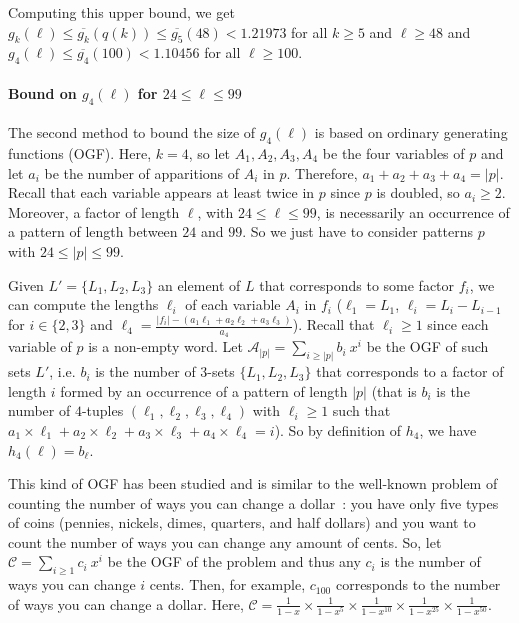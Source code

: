 \documentclass[]{elsart}
\newcommand{\set}[1]{\{#1\}}
\newcounter{example}
\begin{document}
Computing this upper bound, we get $g_k(\ell)\le
\overline{g_k}(q(k))\le \overline{g_5}(48) < 1.21973$ for all $k\ge 5$
and $\ell\ge 48$ and $g_4(\ell)\le \overline{g_4}(100) < 1.10456$ for
all $\ell\ge 100$.

\paragraph{Bound on $g_4(\ell)$ for $24\le \ell\le 99$} \label{par:l2}

The second method to bound the size of $g_4(\ell)$ is based on ordinary
generating functions (OGF). Here, $k=4$, so let $A_1,A_2,A_3,A_4$ be
the four variables of $p$ and let $a_i$ be the number of apparitions
of $A_i$ in $p$. Therefore, $a_1+a_2+a_3+a_4=|p|$. Recall that each
variable appears at least twice in $p$ since $p$ is doubled, so
$a_i\ge 2$. Moreover, a factor of length $\ell$, with $24\le\ell\le 99$, is
necessarily an occurrence of a pattern of length between $24$ and
$99$. So we just have to consider patterns $p$ with $24\le|p|\le 99$.

Given $L'=\set{L_1,L_2,L_3}$ an element of $L$ that corresponds to
some factor $f_i$, we can compute the lengths $\ell_i$ of each
variable $A_i$ in $f_i$ ($\ell_1 = L_1$, $\ell_i = L_i-L_{i-1}$ for
$i\in\set{2,3}$ and $\ell_4 =
\frac{|f_i|-(a_1\ell_1+a_2\ell_2+a_3\ell_3)}{a_4}$). Recall that
$\ell_i\ge 1$ since each variable of $p$ is a non-empty word. Let
$\mathcal{A}_{|p|}=\sum_{i\ge |p|}b_i\ x^i$ be the OGF of such sets
$L'$, i.e. $b_i$ is the number of $3$-sets $\set{L_1,L_2,L_3}$ that
corresponds to a factor of length $i$ formed by an occurrence of a
pattern of length $|p|$ (that is $b_i$ is the number of $4$-tuples
$(\ell_1,\ell_2,\ell_3,\ell_4)$ with $\ell_i\ge 1$ such that
$a_1\times \ell_1+ a_2\times \ell_2+ a_3\times \ell_3+a_4\times
\ell_4=i$). So by definition of $h_4$, we have $h_4(\ell)=b_\ell$.

This kind of OGF has been studied and is similar to the well-known
problem of counting the number of ways you can change a
dollar~\cite{polya:1983}: you have only five types of coins (pennies,
nickels, dimes, quarters, and half dollars) and you want to count the
number of ways you can change any amount of cents. So, let
$\mathcal{C}=\sum_{i\ge 1}c_i\ x^i$ be the OGF of the problem and thus
any $c_i$ is the number of ways you can change $i$ cents. Then, for example,
$c_{100}$ corresponds to the number of ways you can change a
dollar. Here, $\mathcal{C}=\frac{1}{1-x}\times \frac{1}{1-x^5}\times
\frac{1}{1-x^{10}}\times \frac{1}{1-x^{25}}\times \frac{1}{1-x^{50}}$.
\end{document}
